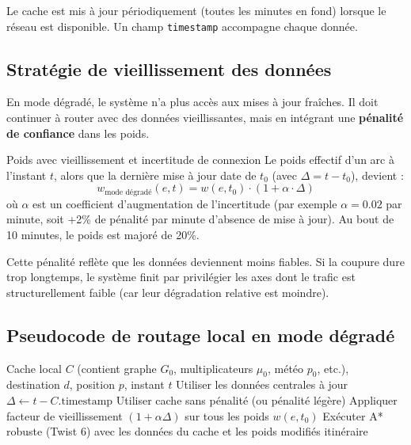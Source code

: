 \documentclass[12pt,a4paper]{article}
\theoremstyle{definition}
\theoremstyle{remark}
\begin{document}
Le cache est mis à jour périodiquement (toutes les minutes en fond)
lorsque le réseau est disponible. Un champ \texttt{timestamp}
accompagne chaque donnée.

\subsection{Stratégie de vieillissement des données}

En mode dégradé, le système n’a plus accès aux mises à jour fraîches.
Il doit continuer à router avec des données vieillissantes, mais en
intégrant une \textbf{pénalité de confiance} dans les poids.

\begin{defbox}{Poids avec vieillissement et incertitude de connexion}
Le poids effectif d’un arc à l’instant $t$, alors que la dernière
mise à jour date de $t_0$ (avec $\Delta = t - t_0$), devient :
\[
  w_{\text{mode dégradé}}(e, t) = w(e, t_0) \cdot (1 + \alpha \cdot \Delta)
\]
où $\alpha$ est un coefficient d’augmentation de l’incertitude
(par exemple $\alpha = 0.02$ par minute, soit +2\% de pénalité
par minute d’absence de mise à jour). Au bout de 10 minutes,
le poids est majoré de 20\%.
\end{defbox}

Cette pénalité reflète que les données deviennent moins fiables.
Si la coupure dure trop longtemps, le système finit par privilégier
les axes dont le trafic est structurellement faible (car leur
dégradation relative est moindre).

\subsection{Pseudocode de routage local en mode dégradé}

\begin{algorithm}[H]
\caption{Routage local avec cache (embarqué)}
\begin{algorithmic}[1]
\Require Cache local $C$ (contient graphe $G_0$, multiplicateurs $\mu_0$,
         météo $p_0$, etc.), destination $d$, position $p$, instant $t$
    \State Utiliser les données centrales à jour
\Else
    \State $\Delta \gets t - C.\text{timestamp}$
        \State Utiliser cache sans pénalité (ou pénalité légère)
    \Else
        \State Appliquer facteur de vieillissement $(1 + \alpha\Delta)$
            sur tous les poids $w(e, t_0)$
    \EndIf
    \State Exécuter A* robuste (Twist 6) avec les données du cache
          et les poids modifiés
\EndIf
\State \Return itinéraire
\end{algorithmic}
\end{algorithm}
\end{document}

